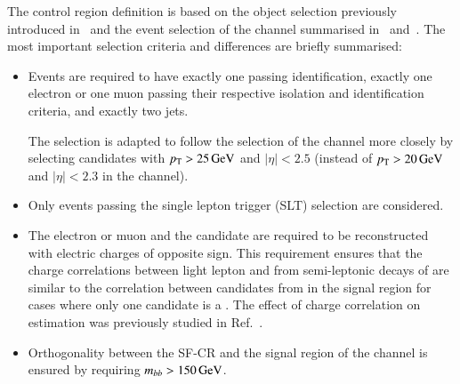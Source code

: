 The control region definition is based on the object selection
previously introduced in~ and the
event selection of the \lephad channel summarised
in~ and~. The most
important selection criteria and differences are briefly summarised:
\begin{itemize}

\item Events are required to have exactly one \tauhadvis passing
  identification, exactly one electron or one muon passing their
  respective isolation and identification criteria, and exactly two
  \btagged jets.

  The \tauhadvis selection is adapted to follow the selection of the
  \hadhad channel more closely by selecting \tauhadvis candidates with
  $p_{\text{T}} > \SI{25}{\ensuremath{\text{GeV}}}$ and $|\eta| < \num{2.5}$ (instead of
  $\pT > \SI{20}{\GeV}$ and $|\eta| < \num{2.3}$ in the \lephad
  channel).

\item Only events passing the single lepton trigger (SLT) selection
  are considered.

\item The electron or muon and the \tauhadvis candidate are required
  to be reconstructed with electric charges of opposite sign. This
  requirement ensures that the charge correlations between light
  lepton and \faketauhadvis from semi-leptonic decays of \ttbar are
  similar to the correlation between \tauhadvis candidates from
  \ttbarFakes in the \hadhad signal region for cases where only one
  candidate is a \faketauhadvis. The effect of charge correlation on
  \ttbarFakes estimation was previously studied in Ref.~\cite{bokan}.

\item Orthogonality between the SF-CR and the signal region of the
  \lephad channel is ensured by requiring $m_{bb} > \SI{150}{\ensuremath{\text{GeV}}}$.

\end{itemize}


